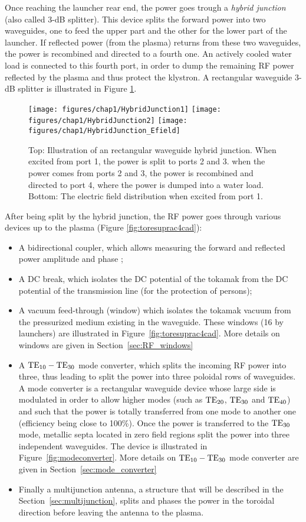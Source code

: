 Once reaching the launcher rear end, the power goes trough a \textit{hybrid junction} (also called 3-dB splitter). This device splits the forward power into two waveguides, one to feed the upper part and the other for the lower part of the launcher.  If reflected power (from the plasma) returns from these two waveguides, the power is recombined and directed to a fourth one. An actively cooled water load is connected to this fourth port, in order to dump the remaining RF power reflected by the plasma and thus protect the klystron. A rectangular waveguide 3-dB splitter is illustrated in Figure \ref{fig:hybridjunction1}. 

\begin{figure}[h]
	\centering
	\texttt{[image: figures/chap1/HybridJunction1]}
	\texttt{[image: figures/chap1/HybridJunction2]}
	\texttt{[image: figures/chap1/HybridJunction\_Efield]}
	\caption{Top: Illustration of an rectangular waveguide hybrid junction. When excited from port 1, the power is split to ports 2 and 3. when the power comes from ports 2 and 3, the power is recombined and directed to port 4, where the power is dumped into a water load. Bottom: The electric field distribution when excited from port 1. }
	\label{fig:hybridjunction1}
\end{figure}


After being split by the hybrid junction, the RF power goes through various devices up to the plasma (Figure \ref{fig:toresuprac4cad}): 
\begin{itemize}
	\item A bidirectional coupler, which allows measuring the forward and reflected power amplitude and phase ;
	\item A DC break, which isolates the DC potential of the tokamak from the DC potential of the transmission line (for the protection of persons);
	\item A vacuum feed-through (window) which isolates the tokamak vacuum from the pressurized medium existing in the waveguide. These windows (16 by launchers) are illustrated in Figure~\ref{fig:toresuprac4cad}. More details on windows are given in Section~\ref{sec:RF_windows}
	\item A ${\mathrm{TE}}_{10}-{\mathrm{TE}}_{30}$ mode converter, which splits the incoming RF power into three, thus leading to split the power into three poloidal rows of waveguides. A mode converter is a rectangular waveguide device whose large side is modulated in order to allow higher modes (such as ${\mathrm{TE}}_{20}$, ${\mathrm{TE}}_{30}$ and ${\mathrm{TE}}_{40}$) and such that the power is totally transferred from one mode to another one (efficiency being close to 100\%). Once the power is transferred to the ${\mathrm{TE}}_{30}$ mode, metallic septa located in zero field regions split the power into three independent waveguides. The device is illustrated in Figure~\ref{fig:modeconverter}. More details on ${\mathrm{TE}}_{10}-{\mathrm{TE}}_{30}$ mode converter are given in Section~\ref{sec:mode_converter}
	\item Finally a multijunction antenna, a structure that will be described in the Section~\ref{sec:multijunction}, splits and phases the power in the toroidal direction before leaving the antenna to the plasma. 
\end{itemize}


